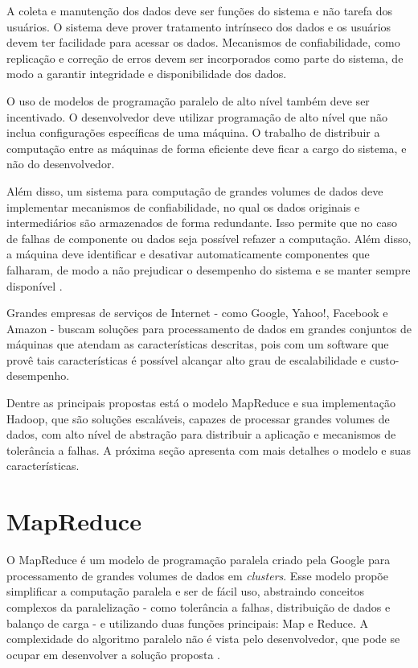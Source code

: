 A coleta e manutenção dos dados deve ser funções do sistema e não tarefa dos usuários. O sistema deve prover tratamento intrínseco dos dados  e os usuários devem ter facilidade para acessar os dados. Mecanismos de confiabilidade, como replicação e  correção de erros devem ser incorporados como parte do sistema, de modo a garantir integridade e disponibilidade dos dados.

O uso de modelos de programação paralelo de alto nível também deve ser incentivado. O desenvolvedor deve utilizar programação de alto nível que não inclua configurações específicas de uma máquina. O trabalho de distribuir a computação entre as máquinas de forma eficiente deve ficar a cargo do sistema, e não do desenvolvedor.


Além disso, um sistema para computação de grandes volumes de dados deve implementar mecanismos de confiabilidade, no qual os dados originais e intermediários são armazenados de forma redundante. Isso permite que no caso de falhas de componente ou dados seja possível refazer a computação. Além disso, a máquina deve identificar e desativar automaticamente componentes que falharam, de modo a não prejudicar o desempenho do sistema e se manter sempre disponível \cite{Bryant:2011}.

Grandes empresas de serviços de Internet - como Google, Yahoo!, Facebook e Amazon - buscam soluções para processamento de dados em grandes conjuntos de máquinas que atendam as características descritas, pois com um software que provê tais características é possível alcançar alto grau de escalabilidade e custo-desempenho. 

Dentre as principais propostas está o modelo MapReduce e sua implementação Hadoop, que são soluções escaláveis, capazes de processar grandes volumes de dados, com alto nível de abstração para distribuir a aplicação e mecanismos de tolerância a falhas.
A próxima seção apresenta com mais detalhes o modelo e suas características.

\section{MapReduce}
O MapReduce é um modelo de programação paralela criado pela Google para processamento de grandes volumes de dados em \textit{clusters}. Esse modelo propõe simplificar a computação paralela e ser de fácil uso, abstraindo conceitos complexos da paralelização - como tolerância a falhas, distribuição de dados e balanço de carga - e utilizando duas funções principais: Map e Reduce. A complexidade do algoritmo paralelo não é vista pelo desenvolvedor, que pode se ocupar em desenvolver a solução proposta \cite{Dean:2008}.

